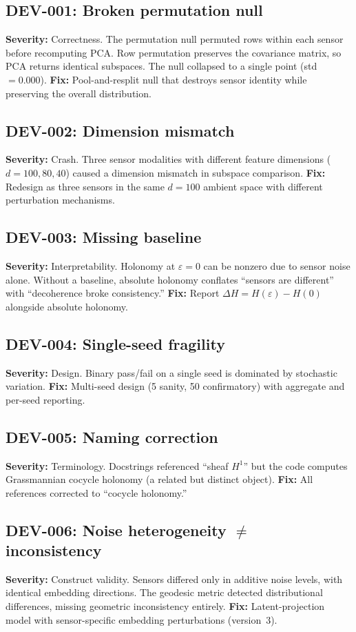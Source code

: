 \documentclass[11pt]{article}
\newcommand{\eps}{\varepsilon}
\begin{document}
\subsection*{DEV-001: Broken permutation null}
\textbf{Severity:} Correctness.
The permutation null permuted rows within each sensor before
recomputing PCA.  Row permutation preserves the covariance matrix,
so PCA returns identical subspaces.  The null collapsed to a single
point (std $= 0.000$).
\textbf{Fix:} Pool-and-resplit null that destroys sensor identity
while preserving the overall distribution.

\subsection*{DEV-002: Dimension mismatch}
\textbf{Severity:} Crash.
Three sensor modalities with different feature dimensions ($d =
100, 80, 40$) caused a dimension mismatch in subspace comparison.
\textbf{Fix:} Redesign as three sensors in the same $d = 100$
ambient space with different perturbation mechanisms.

\subsection*{DEV-003: Missing baseline}
\textbf{Severity:} Interpretability.
Holonomy at $\eps = 0$ can be nonzero due to sensor noise alone.
Without a baseline, absolute holonomy conflates ``sensors are
different'' with ``decoherence broke consistency.''
\textbf{Fix:} Report $\Delta H = H(\eps) - H(0)$ alongside
absolute holonomy.

\subsection*{DEV-004: Single-seed fragility}
\textbf{Severity:} Design.
Binary pass/fail on a single seed is dominated by stochastic
variation.
\textbf{Fix:} Multi-seed design (5 sanity, 50 confirmatory) with
aggregate and per-seed reporting.

\subsection*{DEV-005: Naming correction}
\textbf{Severity:} Terminology.
Docstrings referenced ``sheaf $H^1$'' but the code computes
Grassmannian cocycle holonomy (a related but distinct object).
\textbf{Fix:} All references corrected to ``cocycle holonomy.''

\subsection*{DEV-006: Noise heterogeneity $\neq$ inconsistency}
\textbf{Severity:} Construct validity.
Sensors differed only in additive noise levels, with identical
embedding directions.
The geodesic metric detected distributional differences,
missing geometric inconsistency entirely.
\textbf{Fix:} Latent-projection model with sensor-specific
embedding perturbations (version~3).
\end{document}
